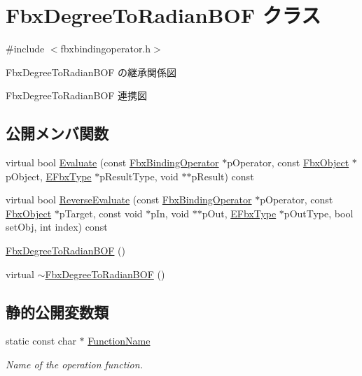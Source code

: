 \hypertarget{class_fbx_degree_to_radian_b_o_f}{}\section{Fbx\+Degree\+To\+Radian\+B\+OF クラス}
\label{class_fbx_degree_to_radian_b_o_f}


{\ttfamily \#include $<$fbxbindingoperator.\+h$>$}



Fbx\+Degree\+To\+Radian\+B\+OF の継承関係図


Fbx\+Degree\+To\+Radian\+B\+OF 連携図
\subsection*{公開メンバ関数}
\begin{DoxyCompactItemize}
\item 
virtual bool \hyperlink{class_fbx_degree_to_radian_b_o_f_a6cee9578c7edb1b27f90f72ac9ec7000}{Evaluate} (const \hyperlink{class_fbx_binding_operator}{Fbx\+Binding\+Operator} $\ast$p\+Operator, const \hyperlink{class_fbx_object}{Fbx\+Object} $\ast$p\+Object, \hyperlink{fbxpropertytypes_8h_a73913a5ddfb20e57c6f25e9e6784bd92}{E\+Fbx\+Type} $\ast$p\+Result\+Type, void $\ast$$\ast$p\+Result) const
\item 
virtual bool \hyperlink{class_fbx_degree_to_radian_b_o_f_a65c7f3fdae835f27e123b2efc8aaf9da}{Reverse\+Evaluate} (const \hyperlink{class_fbx_binding_operator}{Fbx\+Binding\+Operator} $\ast$p\+Operator, const \hyperlink{class_fbx_object}{Fbx\+Object} $\ast$p\+Target, const void $\ast$p\+In, void $\ast$$\ast$p\+Out, \hyperlink{fbxpropertytypes_8h_a73913a5ddfb20e57c6f25e9e6784bd92}{E\+Fbx\+Type} $\ast$p\+Out\+Type, bool set\+Obj, int index) const
\item 
\hyperlink{class_fbx_degree_to_radian_b_o_f_a5ec303303a760400996c0115264ca4ad}{Fbx\+Degree\+To\+Radian\+B\+OF} ()
\item 
virtual \hyperlink{class_fbx_degree_to_radian_b_o_f_a4cc35e7abc17e6a76ba7c5857a5f34bd}{$\sim$\+Fbx\+Degree\+To\+Radian\+B\+OF} ()
\end{DoxyCompactItemize}
\subsection*{静的公開変数類}
\begin{DoxyCompactItemize}
\item 
static const char $\ast$ \hyperlink{class_fbx_degree_to_radian_b_o_f_a5a082cbbb422d50fdc37dabab272caba}{Function\+Name}
\begin{DoxyCompactList}\small\item\em Name of the operation function. \end{DoxyCompactList}\end{DoxyCompactItemize}


